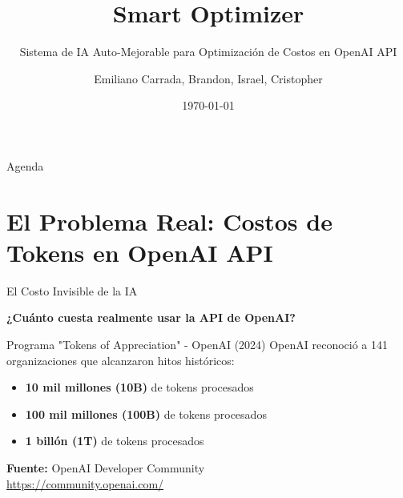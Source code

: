 \documentclass[aspectratio=169,11pt]{beamer}
\title[Smart Optimizer]{Smart Optimizer}
\subtitle{Sistema de IA Auto-Mejorable para Optimización de Costos en OpenAI API}
\author[Equipo]{Emiliano Carrada, Brandon, Israel, Cristopher}
\institute[Kavak x OpenAI]{Hackathon Kavak x OpenAI México 2025}
\date{\today}
\begin{document}
\begin{frame}
\titlepage
\end{frame}

\begin{frame}{Agenda}
\tableofcontents
\end{frame}

\section{El Problema Real: Costos de Tokens en OpenAI API}

\begin{frame}{El Costo Invisible de la IA}
\begin{center}
\Large \textbf{¿Cuánto cuesta realmente usar la API de OpenAI?}
\end{center}

\vspace{0.5cm}

\begin{block}{Programa "Tokens of Appreciation" - OpenAI (2024)}
OpenAI reconoció a 141 organizaciones que alcanzaron hitos históricos:
\begin{itemize}
    \item \textcolor{kavakgreen}{\textbf{10 mil millones (10B)}} de tokens procesados
    \item \textcolor{kavakorange}{\textbf{100 mil millones (100B)}} de tokens procesados
    \item \textcolor{kavakred}{\textbf{1 billón (1T)}} de tokens procesados
\end{itemize}
\end{block}

\vspace{0.3cm}

\footnotesize
\textbf{Fuente:} OpenAI Developer Community \\
\url{https://community.openai.com/}
\end{frame}
\end{document}
